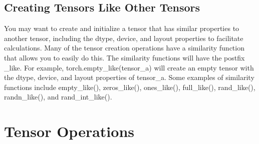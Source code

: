 \subsection{Creating Tensors Like Other Tensors}
You may want to create and initialize a tensor that has
similar properties to another tensor, including the dtype,
device, and layout properties to facilitate calculations.
Many of the tensor creation operations have a similarity function that allows you to easily do this. The similarity functions
will have the postfix \textsf{\_like}. For example, \textsf{torch.empty\_like(tensor\_a)} will create an empty tensor with the dtype, device, and
layout properties of \textsf{tensor\_a}. Some examples of similarity
functions include \textsf{empty\_like()}, \textsf{zeros\_like()}, \textsf{ones\_like()},
\textsf{full\_like()}, \textsf{rand\_like()}, \textsf{randn\_like()}, and \textsf{rand\_int\_like()}.
\section{Tensor Operations}
